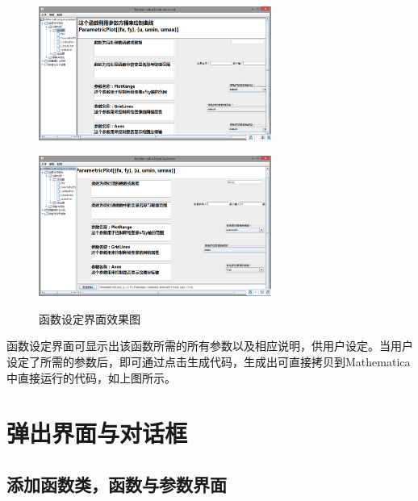 \documentclass[hyperref, UTF8
,bookmarksnumbered=true, oneside]{ctexbook}
\begin{document}
		\begin{figure}[!h]
			\begin{minipage}[b]{0.45\textwidth}
			\centering
			\includegraphics[width=3in]{Right2.png}
			\label{pic:MathPack}
			\end{minipage}%
			\hspace{0.1\textwidth}%
			\begin{minipage}[b]{0.45\textwidth}
			\centering
			\includegraphics[width=3in]{Right3.png}
			\label{pic:GUIPack}
			\end{minipage}
			\caption{函数设定界面效果图}
		\end{figure}

		函数设定界面可显示出该函数所需的所有参数以及相应说明，供用户设定。当用户设定了所需的参数后，即可通过点击生成代码，生成出可直接拷贝到Mathematica中直接运行的代码，如上图所示。

		

	\section{弹出界面与对话框} %
		
		\subsection{添加函数类，函数与参数界面} %
\end{document}
